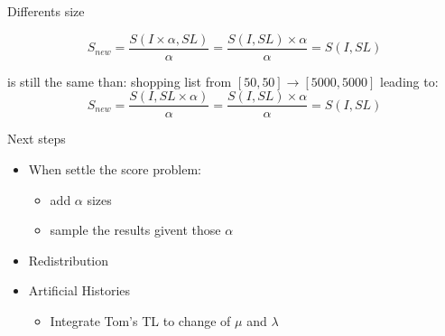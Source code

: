 \documentclass[12pt, notes=show]{beamer}
\begin{document}
\begin{frame}{Differents size}
     
     $$S_{new}=\frac{S(I\times \alpha,SL) }{\alpha}= \frac{S(I,SL)\times \alpha }{\alpha} = S(I,SL)$$
     
    is still the same than: shopping list from $[50,50] \rightarrow [5000,5000]$ leading to: 
     $$S_{new}=\frac{S(I,SL \times \alpha)}{\alpha}=\frac{S(I,SL) \times \alpha }{\alpha} = S(I,SL)$$
     
     
     
 \end{frame}

 \begin{frame}{Next steps}
     \begin{itemize}
	 \item When settle the score problem:
	     \begin{itemize}
		 \item add $\alpha$ sizes
		 \item sample the results givent those $\alpha$
	     \end{itemize}
	 \item Redistribution
	 \item Artificial Histories
	     \begin{itemize}
		 \item Integrate Tom's TL to change of $\mu$ and $\lambda$
	     \end{itemize}
     \end{itemize}
 \end{frame}
     
\end{document}
